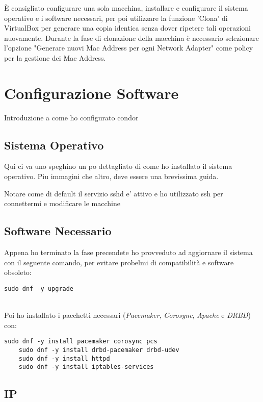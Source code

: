 \`{E} consigliato configurare una sola macchina, installare e configurare il sistema operativo e i software necessari, per poi utilizzare la funzione 'Clona' di VirtualBox per generare una copia identica senza dover ripetere tali operazioni nuovamente. Durante la fase di clonazione della macchina \`{e} necessario selezionare l'opzione "Generare nuovi Mac Address per ogni Network Adapter" come policy per la gestione dei Mac Address.
 
\section{Configurazione Software}

Introduzione a come ho configurato condor

\subsection{Sistema Operativo}

Qui ci va uno speghino un po dettagliato di come ho installato il sistema operativo. Piu immagini che altro, deve essere una brevissima guida.

Notare come di default il servizio sshd e' attivo e ho utilizzato ssh per connettermi e modificare le macchine

\subsection{Software Necessario}

Appena ho terminato la fase precendete ho provveduto ad aggiornare il sistema con il seguente comando, per evitare probelmi di compatibilit\`{a} e software obsoleto:

\begin{lstlisting}[style=cmd]
	sudo dnf -y upgrade
\end{lstlisting} 
\ \\
Poi ho installato i pacchetti necessari (\textit{Pacemaker}, \textit{Corosync}, \textit{Apache} e \textit{DRBD}) con: 

\begin{lstlisting}[style=cmd]
	sudo dnf -y install pacemaker corosync pcs
	sudo dnf -y install drbd-pacemaker drbd-udev
	sudo dnf -y install httpd
	sudo dnf -y install iptables-services
\end{lstlisting} 

\subsection{IP}

